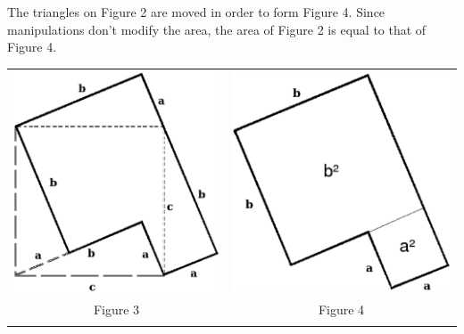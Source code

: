 \documentclass[letterpaper, 12pt]{article}
\begin{document}
The triangles on Figure 2 are moved in order to form Figure 4. Since manipulations don't modify the area, the area of Figure 2 is equal to that of Figure 4.
\begin{center}
\begin{tabular}{c c}
\includegraphics[scale=0.35]{pythagore21.eps} & \includegraphics[scale=0.35]{a2b2.eps}\\
{\small Figure 3} & {\small Figure 4} \\
 & \\
\end{tabular}
\end{center}
\end{document}
